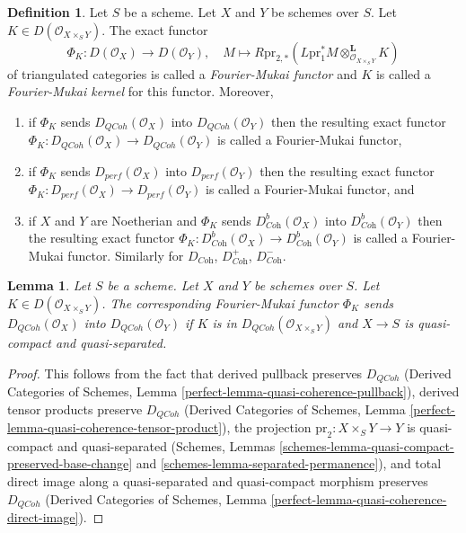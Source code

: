 \documentclass{stacks-project}
\theoremstyle{plain}
\newtheorem{lemma}[subsection]{Lemma}
\theoremstyle{definition}
\newtheorem{definition}[subsection]{Definition}
\theoremstyle{remark}
\numberwithin{equation}{subsection}
\def\QCoh{\mathit{QCoh}}
\begin{document}
\begin{definition}
\label{definition-fourier-mukai-functor}
Let $S$ be a scheme. Let $X$ and $Y$ be schemes over $S$.
Let $K \in D(\mathcal{O}_{X \times_S Y})$. The exact functor
$$
\Phi_K : D(\mathcal{O}_X) \longrightarrow D(\mathcal{O}_Y),\quad
M \longmapsto R\text{pr}_{2, *}(
L\text{pr}_1^*M \otimes_{\mathcal{O}_{X \times_S Y}}^\mathbf{L} K)
$$
of triangulated categories is called a {\it Fourier-Mukai functor}
and $K$ is called a {\it Fourier-Mukai kernel} for this functor.
Moreover,
\begin{enumerate}
\item if $\Phi_K$ sends $D_\QCoh(\mathcal{O}_X)$ into $D_\QCoh(\mathcal{O}_Y)$
then the resulting exact functor
$\Phi_K : D_\QCoh(\mathcal{O}_X) \to D_\QCoh(\mathcal{O}_Y)$
is called a Fourier-Mukai functor,
\item if $\Phi_K$ sends $D_{perf}(\mathcal{O}_X)$ into
$D_{perf}(\mathcal{O}_Y)$ then the resulting exact functor
$\Phi_K : D_{perf}(\mathcal{O}_X) \to D_{perf}(\mathcal{O}_Y)$
is called a Fourier-Mukai functor, and
\item if $X$ and $Y$ are Noetherian and $\Phi_K$ sends
$D^b_{\textit{Coh}}(\mathcal{O}_X)$ into $D^b_{\textit{Coh}}(\mathcal{O}_Y)$
then the resulting exact functor
$\Phi_K : D^b_{\textit{Coh}}(\mathcal{O}_X) \to
D^b_{\textit{Coh}}(\mathcal{O}_Y)$
is called a Fourier-Mukai functor.
Similarly for $D_{\textit{Coh}}$, $D^+_{\textit{Coh}}$, $D^-_{\textit{Coh}}$.
\end{enumerate}
\end{definition}

\begin{lemma}
\label{lemma-fourier-Mukai-QCoh}
Let $S$ be a scheme. Let $X$ and $Y$ be schemes over $S$.
Let $K \in D(\mathcal{O}_{X \times_S Y})$.
The corresponding Fourier-Mukai functor $\Phi_K$ sends
$D_\QCoh(\mathcal{O}_X)$ into $D_\QCoh(\mathcal{O}_Y)$
if $K$ is in $D_\QCoh(\mathcal{O}_{X \times_S Y})$ and $X \to S$ is
quasi-compact and quasi-separated.
\end{lemma}

\begin{proof}
This follows from the fact that derived pullback preserves
$D_\QCoh$
(Derived Categories of Schemes, Lemma
\ref{perfect-lemma-quasi-coherence-pullback}),
derived tensor products preserve $D_\QCoh$
(Derived Categories of Schemes, Lemma
\ref{perfect-lemma-quasi-coherence-tensor-product}),
the projection $\text{pr}_2 : X \times_S Y \to Y$ is
quasi-compact and quasi-separated
(Schemes, Lemmas
\ref{schemes-lemma-quasi-compact-preserved-base-change} and
\ref{schemes-lemma-separated-permanence}), and
total direct image along a quasi-separated and quasi-compact
morphism preserves $D_\QCoh$
(Derived Categories of Schemes, Lemma
\ref{perfect-lemma-quasi-coherence-direct-image}).
\end{proof}
\end{document}
